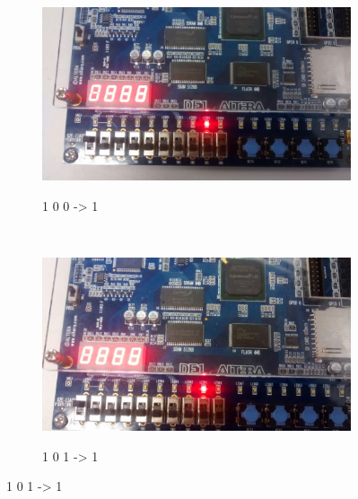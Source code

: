 \begin{figure}
		\begin{subfigure}[b]{0.44\textwidth}
	        \includegraphics[width=\textwidth]{img/cenario2/circ5}
	        \label{fig:circ5}
			\caption{1 0 0 -> 1}
	    \end{subfigure}
	    ~
	    \begin{subfigure}[b]{0.44\textwidth}
	        \includegraphics[width=\textwidth]{img/cenario2/circ6}
	        \label{fig:circ6}
			\caption{1 0 1 -> 1}
	    \end{subfigure}


\end{figure}

